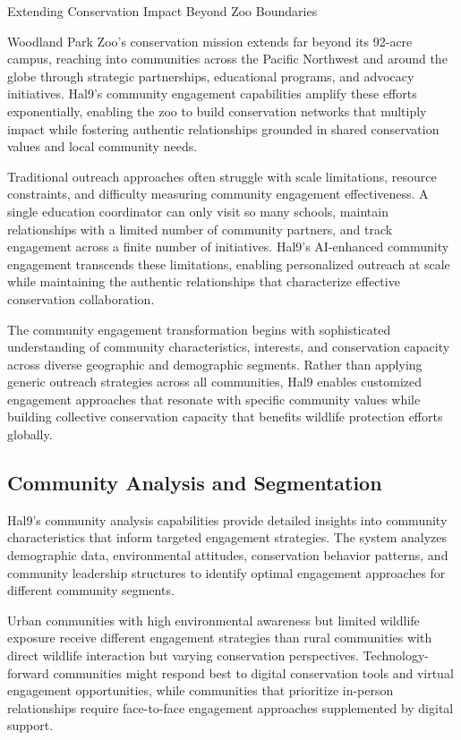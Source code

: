 \documentclass[
  Letterpaper,
]{scrbook}
\begin{document}
Extending Conservation Impact Beyond Zoo Boundaries

\hfill\break

Woodland Park Zoo's conservation mission extends far beyond its 92-acre
campus, reaching into communities across the Pacific Northwest and
around the globe through strategic partnerships, educational programs,
and advocacy initiatives. Hal9's community engagement capabilities
amplify these efforts exponentially, enabling the zoo to build
conservation networks that multiply impact while fostering authentic
relationships grounded in shared conservation values and local community
needs.

Traditional outreach approaches often struggle with scale limitations,
resource constraints, and difficulty measuring community engagement
effectiveness. A single education coordinator can only visit so many
schools, maintain relationships with a limited number of community
partners, and track engagement across a finite number of initiatives.
Hal9's AI-enhanced community engagement transcends these limitations,
enabling personalized outreach at scale while maintaining the authentic
relationships that characterize effective conservation collaboration.

The community engagement transformation begins with sophisticated
understanding of community characteristics, interests, and conservation
capacity across diverse geographic and demographic segments. Rather than
applying generic outreach strategies across all communities, Hal9
enables customized engagement approaches that resonate with specific
community values while building collective conservation capacity that
benefits wildlife protection efforts globally.

\subsection{Community Analysis and
Segmentation}\label{community-analysis-and-segmentation}

Hal9's community analysis capabilities provide detailed insights into
community characteristics that inform targeted engagement strategies.
The system analyzes demographic data, environmental attitudes,
conservation behavior patterns, and community leadership structures to
identify optimal engagement approaches for different community segments.

Urban communities with high environmental awareness but limited wildlife
exposure receive different engagement strategies than rural communities
with direct wildlife interaction but varying conservation perspectives.
Technology-forward communities might respond best to digital
conservation tools and virtual engagement opportunities, while
communities that prioritize in-person relationships require face-to-face
engagement approaches supplemented by digital support.
\end{document}
